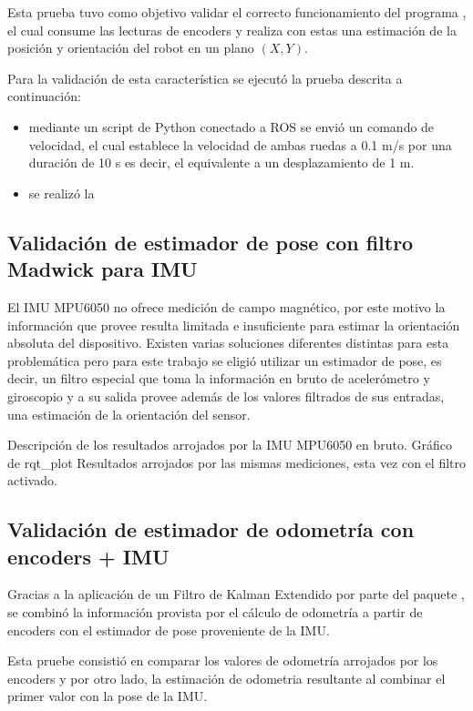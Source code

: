 Esta prueba tuvo como objetivo validar el correcto funcionamiento del programa , el cual consume las lecturas de encoders y realiza con estas una estimación de la posición y orientación del robot en un plano $(X,Y)$.

Para la validación de esta característica se ejecutó la prueba descrita a continuación:

\begin{itemize}
    \item mediante un script de Python conectado a ROS se envió un comando de velocidad, el cual establece la velocidad de ambas ruedas a 0.1 m/s por una duración de 10 s es decir, el equivalente a un desplazamiento de 1 m.
    \item se realizó la
\end{itemize}

\subsection{Validación de estimador de pose con filtro Madwick para IMU}

El IMU MPU6050 no ofrece medición de campo magnético, por este motivo la información que provee resulta limitada e insuficiente para estimar la orientación absoluta del dispositivo.
Existen varias soluciones diferentes distintas para esta problemática pero para este trabajo se eligió utilizar un estimador de pose, es decir, un filtro especial que toma la información en bruto de acelerómetro y giroscopio y a su salida provee además de los valores filtrados de sus entradas, una estimación de la orientación del sensor.

Descripción de los resultados arrojados por la IMU MPU6050 en bruto. Gráfico de rqt\_plot
Resultados arrojados por las mismas mediciones, esta vez con el filtro activado.

\subsection{Validación de estimador de odometría con encoders + IMU}

Gracias a la aplicación de un Filtro de Kalman Extendido por parte del paquete , se combinó la información provista por el cálculo de odometría a partir de encoders con el estimador de pose proveniente de la IMU.

Esta pruebe consistió en comparar los valores de odometría arrojados por los encoders y por otro lado, la estimación de odometria resultante al combinar el primer valor con la pose de la IMU.

